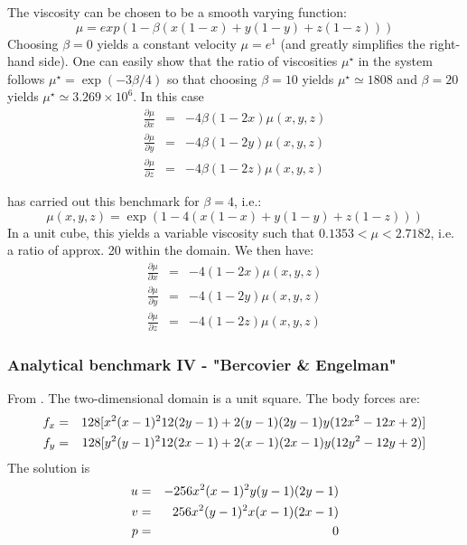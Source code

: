 The viscosity can be chosen to be a smooth varying function:
\begin{equation}
\mu = exp(1 - \beta(x(1 - x) + y(1 - y) + z(1 - z)))
\end{equation}
Choosing $\beta=0$ yields a constant velocity $\mu=e^1$ (and greatly simplifies the right-hand side).
One can easily show that the ratio of viscosities $\mu^\star$
in the system follows $\mu^\star=\exp(-3\beta/4)$ so that choosing $\beta=10$ yields
$\mu^\star\simeq 1808$ and $\beta=20$ yields $\mu^\star\simeq 3.269\times10^6$.
In this case
\begin{eqnarray}
\frac{\partial \mu}{\partial x}&=&-4\beta(1-2x)\mu(x,y,z)\\
\frac{\partial \mu}{\partial y}&=&-4\beta(1-2y)\mu(x,y,z)\\
\frac{\partial \mu}{\partial z}&=&-4\beta(1-2z)\mu(x,y,z)
\end{eqnarray}


\cite{busa13} has carried out this benchmark for $\beta=4$, i.e.: 
\[
\mu(x,y,z)=\exp ( 1-4( x(1-x)+y(1-y)+z(1-z)  )  )
\]
In a unit cube, this yields a variable viscosity such that
$0.1353 < \mu <   2.7182$, i.e. a ratio of approx. 20 within the domain. We then have:
\begin{eqnarray}
\frac{\partial \mu}{\partial x}&=&-4(1-2x)\mu(x,y,z)\\
\frac{\partial \mu}{\partial y}&=&-4(1-2y)\mu(x,y,z)\\
\frac{\partial \mu}{\partial z}&=&-4(1-2z)\mu(x,y,z)
\end{eqnarray}



\subsubsection{Analytical benchmark IV \label{mms4} - "Bercovier \& Engelman"}

From \cite{been79}. The two-dimensional domain is a unit square. The body forces are:
\begin{eqnarray}
f_x &=& 128[ x^2(x-1)^2 12 (2y-1) + 2 (y-1)(2y-1)y(12x^2-12x+2)  ] \nonumber\\
f_y &=& 128[ y^2(y-1)^2 12 (2x-1) + 2 (x-1)(2x-1)y(12y^2-12y+2)  ] \nonumber\\
\end{eqnarray}
The solution is
\begin{eqnarray}
u &=& -256x^2(x-1)^2y(y-1)(2y-1) \nonumber\\
v &=&  256x^2(y-1)^2x(x-1)(2x-1) \nonumber\\
p &=& 0 
\end{eqnarray}

